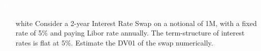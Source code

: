 \documentclass{beamer}
\begin{document}


%
%
%



\begin{homework}
\begin{frame}{\textcolor{white}{Homework}}
\begin{itemize}
\item[white] Consider a 2-year Interest Rate Swap on a notional of 1M, with a fixed rate of 5\% and paying Libor rate annually. The term-structure of interest rates is flat at 5\%.
Estimate the DV01 of the swap numerically.  
\end{itemize}
\end{frame}
\end{homework}
\end{document}
